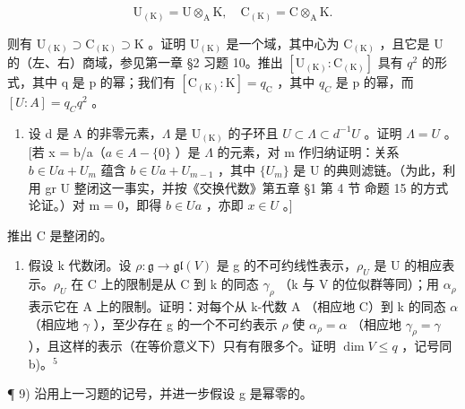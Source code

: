 \[
\mathrm{U} _ {(\mathrm{K})} = \mathrm{U} \otimes_ {\mathrm{A}} \mathrm{K}, \quad \mathrm{C} _ {(\mathrm{K})} = \mathrm{C} \otimes_ {\mathrm{A}} \mathrm{K}.
\]

则有 \(\mathrm{U}_{(\mathrm{K})}\supset\mathrm{C}_{(\mathrm{K})}\supset\mathrm{K}\) 。证明 \(\mathrm{U}_{(\mathrm{K})}\) 是一个域，其中心为 \(\mathrm{C}_{(\mathrm{K})}\) ，且它是 U 的（左、右）商域，参见第一章 §2 习题 10。推出 \([\mathrm{U}_{(\mathrm{K})}:\mathrm{C}_{(\mathrm{K})}]\) 具有 \(q^{2}\) 的形式，其中 q 是 p 的幂；我们有 \([\mathrm{C}_{(\mathrm{K})}:\mathrm{K}]=q_{\mathrm{C}}\) ，其中 \(q_{C}\) 是 p 的幂，而 \([U:A]=q_{C}q^{2}\) 。

\begin{enumerate}
\def\labelenumi{\alph{enumi})}
\setcounter{enumi}{2}
\tightlist
\item
  设 d 是 A 的非零元素，\(\Lambda\) 是 \(\mathrm{U}_{(\mathrm{K})}\) 的子环且 \(U \subset \Lambda \subset d^{-1}U\) 。证明 \(\Lambda = U\) 。{[}若 x = b/a（\(a \in A - \{0\}\) ）是 \(\Lambda\) 的元素，对 m 作归纳证明：关系 \(b \in Ua + U_m\) 蕴含 \(b \in Ua + U_{m-1}\) ，其中 \(\{U_m\}\) 是 U 的典则滤链。（为此，利用 gr U 整闭这一事实，并按《交换代数》第五章 §1 第 4 节 命题 15 的方式论证。）对 m = 0，即得 \(b \in Ua\) ，亦即 \(x \in U\) 。{]}
\end{enumerate}

推出 C 是整闭的。

\begin{enumerate}
\def\labelenumi{\alph{enumi})}
\setcounter{enumi}{3}
\tightlist
\item
  假设 k 代数闭。设 \(\rho: \mathfrak{g} \to \mathfrak{gl}(V)\) 是 g 的不可约线性表示，\(\rho_{U}\) 是 U 的相应表示。\(\rho_{U}\) 在 C 上的限制是从 C 到 k 的同态 \(\gamma_{\rho}\) （k 与 V 的位似群等同）；用 \(\alpha_{\rho}\) 表示它在 A 上的限制。证明：对每个从 k-代数 A （相应地 C）到 k 的同态 \(\alpha\) （相应地 \(\gamma\) ），至少存在 g 的一个不可约表示 \(\rho\) 使 \(\alpha_{\rho} = \alpha\) （相应地 \(\gamma_{\rho} = \gamma\) ），且这样的表示（在等价意义下）只有有限多个。证明 \(\dim V \leq q\) ，记号同 b)。\(^{5}\)
\end{enumerate}

¶ 9) 沿用上一习题的记号，并进一步假设 g 是幂零的。

